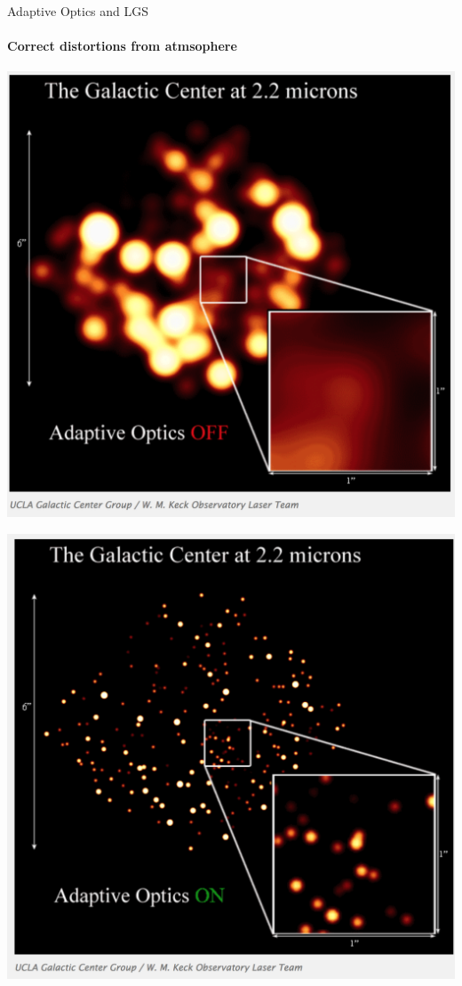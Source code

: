 \documentclass{beamer}
\begin{document}
\begin{frame}{Adaptive Optics and LGS}
  \framesubtitle{Correct distortions from atmsophere}
  \center
 \begin{minipage}{0.45\textwidth}
		  \centering
			\includegraphics[width=1.0\textwidth]{Images/galaxywoao.png}
	\end{minipage}
	\begin{minipage}{0.45\textwidth}
			\centering
			\includegraphics[width=1.0\textwidth]{Images/galaxywao.png}
	\end{minipage}	
\end{frame}
\end{document}
